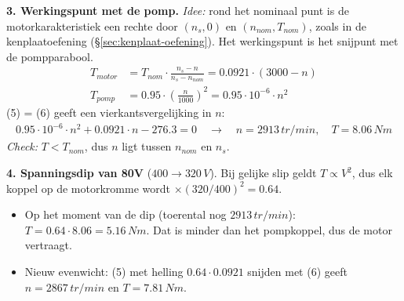 \begin{oefenblok}
    \textbf{3. Werkingspunt met de pomp.}
    \textit{Idee:} rond het nominaal punt is de motorkarakteristiek een rechte door
    $(n_s, 0)$ en $(n_{nom}, T_{nom})$, zoals in de kenplaatoefening
    (§\ref{sec:kenplaat-oefening}).
    Het werkingspunt is het snijpunt met de pompparabool.
    \begin{align}
        T_{motor} &= T_{nom} \cdot \frac{n_s - n}{n_s - n_{nom}} = 0.0921 \cdot (3000 - n) \tag{5} \\
        T_{pomp} &= 0.95 \cdot \left(\frac{n}{1000}\right)^2 = 0.95 \cdot 10^{-6} \cdot n^2 \tag{6}
    \end{align}
    (5) = (6) geeft een vierkantsvergelijking in $n$:
    \begin{align}
        0.95 \cdot 10^{-6} \cdot n^2 + 0.0921 \cdot n - 276.3 = 0
        \quad \rightarrow \quad n = 2913\,tr/min, \quad T = 8.06\,Nm \tag{7}
    \end{align}
    \textit{Check:} $T < T_{nom}$, dus $n$ ligt tussen $n_{nom}$ en $n_s$.

    \textbf{4. Spanningsdip van 80V} ($400 \rightarrow 320\,V$).
    Bij gelijke slip geldt $T \propto V^2$, dus elk koppel op de motorkromme wordt
    $\times (320/400)^2 = 0.64$.
    \begin{itemize}
     \item Op het moment van de dip (toerental nog $2913\,tr/min$):
     $T = 0.64 \cdot 8.06 = 5.16\,Nm$. Dat is minder dan het pompkoppel, dus de motor
     vertraagt.
     \item Nieuw evenwicht: (5) met helling $0.64 \cdot 0.0921$ snijden met (6) geeft
     $n = 2867\,tr/min$ en $T = 7.81\,Nm$.
    \end{itemize}
\end{oefenblok}



\newpage
